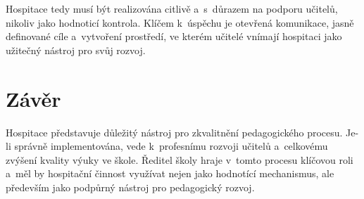 Hospitace tedy musí být realizována citlivě a~s~důrazem na podporu učitelů, nikoliv jako hodnoticí kontrola. Klíčem k~úspěchu je otevřená komunikace, jasně definované cíle a~vytvoření prostředí, ve kterém učitelé vnímají hospitaci jako užitečný nástroj pro svůj rozvoj.

\newpage
\section*{Závěr}

Hospitace představuje důležitý nástroj pro zkvalitnění pedagogického procesu. Je-li správně implementována, vede k~profesnímu rozvoji učitelů a~celkovému zvýšení kvality výuky ve škole. Ředitel školy hraje v~tomto procesu klíčovou roli a~měl by hospitační činnost využívat nejen jako hodnotící mechanismus, ale především jako podpůrný nástroj pro pedagogický rozvoj.